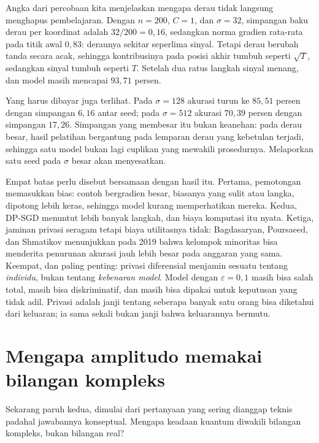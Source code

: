 Angka dari percobaan kita menjelaskan mengapa derau tidak langsung menghapus
pembelajaran. Dengan $n=200$, $C=1$, dan $\sigma=32$, simpangan baku derau per koordinat
adalah $32/200=0{,}16$, sedangkan norma gradien rata-rata pada titik awal $0{,}83$:
deraunya sekitar seperlima sinyal. Tetapi derau berubah tanda secara acak, sehingga
kontribusinya pada posisi akhir tumbuh seperti $\sqrt{T}$, sedangkan sinyal tumbuh
seperti $T$. Setelah dua ratus langkah sinyal menang, dan model masih mencapai
$93{,}71$ persen.

Yang harus dibayar juga terlihat. Pada $\sigma=128$ akurasi turun ke $85{,}51$ persen
dengan simpangan $6{,}16$ antar seed; pada $\sigma=512$ akurasi $70{,}39$ persen dengan
simpangan $17{,}26$. Simpangan yang membesar itu bukan keanehan: pada derau besar, hasil
pelatihan bergantung pada lemparan derau yang kebetulan terjadi, sehingga satu model
bukan lagi cuplikan yang mewakili prosedurnya. Melaporkan satu seed pada $\sigma$ besar
akan menyesatkan.

Empat batas perlu disebut bersamaan dengan hasil itu. Pertama, pemotongan memasukkan
bias: contoh bergradien besar, biasanya yang sulit atau langka, dipotong lebih keras,
sehingga model kurang memperhatikan mereka. Kedua, DP-SGD menuntut lebih banyak langkah,
dan biaya komputasi itu nyata. Ketiga, jaminan privasi seragam tetapi biaya utilitasnya
tidak: Bagdasaryan, Poursaeed, dan Shmatikov menunjukkan pada 2019 bahwa kelompok
minoritas bisa menderita penurunan akurasi jauh lebih besar pada anggaran yang sama. Keempat, dan paling penting:
privasi diferensial menjamin sesuatu tentang \emph{individu}, bukan tentang
\emph{kebenaran model}. Model dengan $\varepsilon=0{,}1$ masih bisa salah total, masih
bisa diskriminatif, dan masih bisa dipakai untuk keputusan yang tidak adil. Privasi
adalah janji tentang seberapa banyak satu orang bisa diketahui dari keluaran; ia sama
sekali bukan janji bahwa keluarannya bermutu.


\section{Mengapa amplitudo memakai bilangan kompleks}

Sekarang paruh kedua, dimulai dari pertanyaan yang sering dianggap teknis padahal
jawabannya konseptual. Mengapa keadaan kuantum diwakili bilangan kompleks, bukan
bilangan real?

